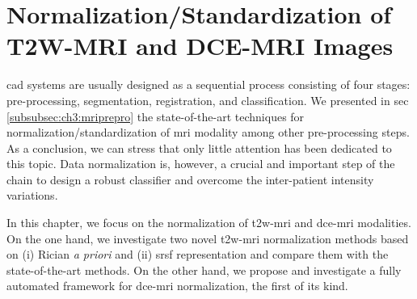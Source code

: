 \acresetall
\chapter{Normalization/Standardization of T2W-MRI and DCE-MRI Images} \label{chap:5}
\Ac{cad} systems are usually designed as a sequential process consisting of four stages: pre-processing, segmentation, registration, and classification.
We presented in \acs{sec}\,\ref{subsubsec:ch3:mriprepro} the state-of-the-art techniques for normalization/standardization of \ac{mri} modality among other pre-processing steps.
As a conclusion, we can stress that only little attention has been dedicated to this topic.
Data normalization is, however, a crucial and important step of the chain to design a robust classifier and overcome the inter-patient intensity variations.

In this chapter, we focus on the normalization of \ac{t2w}-\ac{mri} and \ac{dce}-\ac{mri} modalities.
On the one hand, we investigate two novel \ac{t2w}-\ac{mri} normalization methods based on (i) Rician \emph{a priori} and (ii) \ac{srsf} representation and compare them with the state-of-the-art methods.
On the other hand, we propose and investigate a fully automated framework for \ac{dce}-\ac{mri} normalization, the first of its kind.





